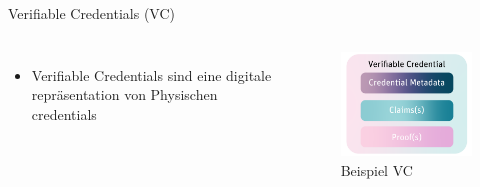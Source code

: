 \documentclass[
	ngerman,%
	authorontitle=true,
	]{bfhbeamer}
\begin{document}
\begin{frame}{Verifiable Credentials (VC)}
    \begin{columns}[onlytextwidth,T]

        \column{70mm}  
        \begin{itemize}
            \item Verifiable Credentials sind eine digitale repräsentation von Physischen credentials
        \end{itemize}

        \column{70mm}
        \begin{figure}
            \centering
            \includegraphics[width=70mm]{../img/VC.png}
            \caption{Beispiel VC}
        \end{figure}

    \end{columns}
\end{frame}
\end{document}
